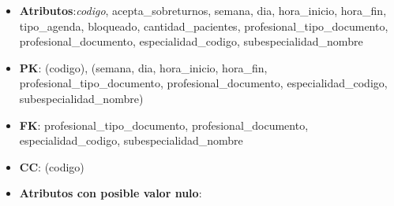 \documentclass[a4paper,11pt]{article}
\begin{document}
\begin{itemize}

\item 
\textbf{Atributos}:\emph{codigo}, acepta\_sobreturnos, semana, dia, hora\_inicio, hora\_fin, tipo\_agenda, bloqueado, cantidad\_pacientes, profesional\_tipo\_documento, profesional\_documento, especialidad\_codigo, subespecialidad\_nombre

\item 
\textbf{PK}: (codigo), (semana, dia, hora\_inicio, hora\_fin, profesional\_tipo\_documento, profesional\_documento, especialidad\_codigo, subespecialidad\_nombre)

\item
\textbf{FK}:  profesional\_tipo\_documento, profesional\_documento, especialidad\_codigo, subespecialidad\_nombre

\item 
\textbf{CC}: (codigo)

\item 
\textbf{Atributos con posible valor nulo}:

\end{itemize}
\end{document}
